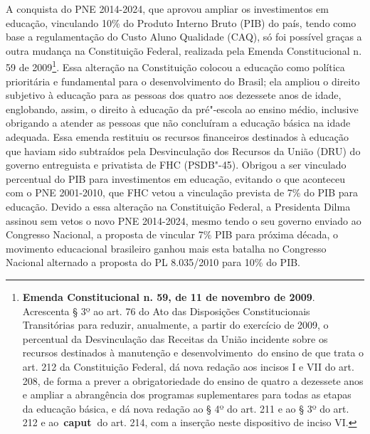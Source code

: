 A conquista do PNE 2014-2024, que aprovou ampliar os investimentos em
educação, vinculando 10\% do Produto Interno Bruto (PIB) do país, tendo
como base a regulamentação do Custo Aluno Qualidade (CAQ), só foi
possível graças a outra mudança na Constituição Federal, realizada pela
Emenda Constitucional n. 59 de 2009\footnote{\textbf{Emenda
  Constitucional n. 59, de 11 de novembro de 2009}. Acrescenta § 3º ao
  art. 76 do Ato das Disposições Constitucionais Transitórias para
  reduzir, anualmente, a partir do exercício de 2009, o percentual da
  Desvinculação das Receitas da União incidente sobre os recursos
  destinados à manutenção e desenvolvimento~do ensino de que trata o
  art. 212 da Constituição Federal, dá nova redação aos incisos I e VII
  do art. 208, de forma a prever a obrigatoriedade do ensino de quatro a
  dezessete anos e ampliar a abrangência dos programas suplementares
  para todas as etapas da educação básica, e dá nova redação ao § 4º do
  art. 211 e ao § 3º do art. 212 e ao~\textbf{caput~}do art. 214, com a
  inserção neste dispositivo de inciso VI.}. Essa alteração na
Constituição colocou a educação como política prioritária e fundamental
para o desenvolvimento do Brasil; ela ampliou o direito subjetivo à
educação para as pessoas dos quatro aos dezessete anos de idade,
englobando, assim, o direito à educação da pré"-escola ao ensino médio,
inclusive obrigando a atender as pessoas que não concluíram a educação
básica na idade adequada. Essa emenda restituiu os recursos financeiros
destinados à educação que haviam sido subtraídos pela Desvinculação dos
Recursos da União (DRU) do governo entreguista e privatista de FHC
(PSDB"-45). Obrigou a ser vinculado percentual do PIB para investimentos
em educação, evitando o que aconteceu com o PNE 2001-2010, que FHC vetou
a vinculação prevista de 7\% do PIB para educação. Devido a essa
alteração na Constituição Federal, a Presidenta Dilma assinou sem vetos
o novo PNE 2014-2024, mesmo tendo o seu governo enviado ao Congresso
Nacional, a proposta de vincular 7\% PIB para próxima década, o
movimento educacional brasileiro ganhou mais esta batalha no Congresso
Nacional alternado a proposta do PL 8.035/2010 para 10\% do PIB.

